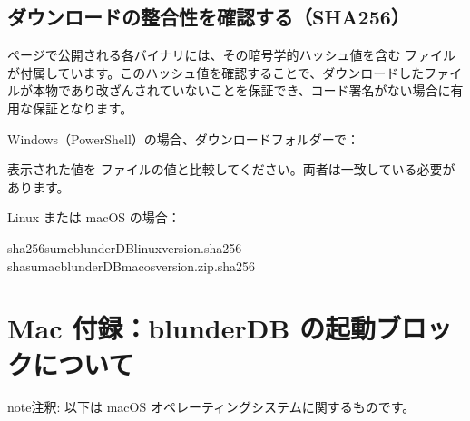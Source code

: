 \documentclass[letterpaper,10pt,dvipdfmx]{sphinxmanual}
\begin{document}
\subsection{ダウンロードの整合性を確認する（SHA256）}
\label{\detokenize{annexe_windows_securite:verifier-l-integrite-du-telechargement-sha256}}
\sphinxAtStartPar
{} ページで公開される各バイナリには、その暗号学的ハッシュ値を含む  ファイルが付属しています。このハッシュ値を確認することで、ダウンロードしたファイルが本物であり改ざんされていないことを保証でき、コード署名がない場合に有用な保証となります。

\sphinxAtStartPar
Windows（PowerShell）の場合、ダウンロードフォルダーで：

\begin{sphinxVerbatim}[commandchars=\\\{\}]
   
\end{sphinxVerbatim}

\sphinxAtStartPar
表示された値を  ファイルの値と比較してください。両者は一致している必要があります。

\sphinxAtStartPar
Linux または macOS の場合：

\begin{sphinxVerbatim}[commandchars=\\\{\}]
sha256sum\PYGZhy{}cblunderDB\PYGZhy{}linux\PYGZhy{}\PYGZlt{}version\PYGZgt{}.sha256
shasum\PYGZhy{}a\PYGZhy{}cblunderDB\PYGZhy{}macos\PYGZhy{}\PYGZlt{}version\PYGZgt{}.zip.sha256
\end{sphinxVerbatim}

\sphinxstepscope


\section{Mac 付録：blunderDB の起動ブロックについて}
\label{\detokenize{annexe_mac_securite:annexe-mac-blocage-eventuel-de-blunderdb}}\label{\detokenize{annexe_mac_securite:annexe-mac-malware}}\label{\detokenize{annexe_mac_securite::doc}}
\begin{sphinxadmonition}{note}{注釈:}
\sphinxAtStartPar
以下は macOS オペレーティングシステムに関するものです。
\end{sphinxadmonition}
\end{document}
